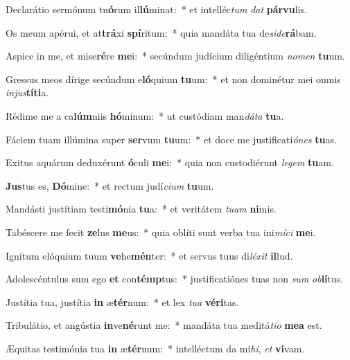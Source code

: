 \item Declarátio sermónum tu\textbf{ó}rum il\textbf{lú}minat:~* et intelléc\textit{tum} \textit{dat} \textbf{pár}\textbf{vu}lis.
\item Os meum apérui, et at\textbf{trá}xi \textbf{spí}ritum:~* quia mandáta tua de\textit{si}\textit{de}\textbf{rá}bam.
\item Aspice in me, et mise\textbf{ré}re \textbf{me}i:~* secúndum judícium diligéntium \textit{no}\textit{men} \textbf{tu}um.
\item Gressus meos dírige secúndum e\textbf{ló}quium \textbf{tu}um:~* et non dominétur mei omnis \textit{in}\textit{jus}\textbf{tí}\textbf{ti}a.
\item Rédime me a ca\textbf{lúm}niis \textbf{hó}minum:~* ut custódiam man\textit{dá}\textit{ta} \textbf{tu}a.
\item Fáciem tuam illúmina super \textbf{ser}vum \textbf{tu}um:~* et doce me justificati\textit{ó}\textit{nes} \textbf{tu}as.
\item Exitus aquárum deduxérunt \textbf{ó}culi \textbf{me}i:~* quia non custodiérunt \textit{le}\textit{gem} \textbf{tu}am.
\item \textbf{Jus}tus es, \textbf{Dó}mine:~* et rectum judí\textit{ci}\textit{um} \textbf{tu}um.
\item Mandásti justítiam testi\textbf{mó}nia \textbf{tu}a:~* et veritátem \textit{tu}\textit{am} \textbf{ni}mis.
\item Tabéscere me fecit \textbf{ze}lus \textbf{me}us:~* quia oblíti sunt verba tua ini\textit{mí}\textit{ci} \textbf{me}i.
\item Ignítum elóquium tuum \textbf{ve}he\textbf{mén}ter:~* et servus tuus di\textit{lé}\textit{xit} \textbf{il}lud.
\item Adolescéntulus sum ego \textbf{et} con\textbf{témp}tus:~* justificatiónes tuas non \textit{sum} \textit{ob}\textbf{lí}tus.
\item Justítia tua, justítia \textbf{in} æ\textbf{tér}num:~* et lex \textit{tu}\textit{a} \textbf{vé}\textbf{ri}tas.
\item Tribulátio, et angústia \textbf{in}ve\textbf{né}runt me:~* mandáta tua meditá\textit{ti}\textit{o} \textbf{me}\textbf{a} est.
\item Æquitas testimónia tua \textbf{in} æ\textbf{tér}num:~* intelléctum da mi\textit{hi}, \textit{et} \textbf{vi}vam.
